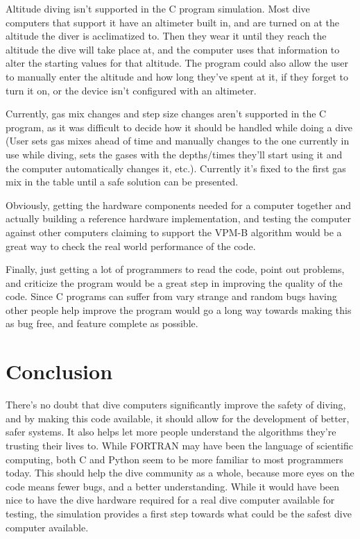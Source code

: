 \documentclass[12pt]{article}
\begin{document}
Altitude diving isn't supported in the C program simulation. Most dive computers that support it
have an altimeter built in, and are turned on at the altitude the diver is acclimatized to. Then
they wear it until they reach the altitude the dive will take place at, and the computer uses that
information to alter the starting values for that altitude. The program could also allow the user
to manually enter the altitude and how long they've spent at it, if they forget to turn it on, or
the device isn't configured with an altimeter.

Currently, gas mix changes and step size changes aren't supported in the C program, as it was difficult
to decide how it should be handled while doing a dive (User sets gas mixes ahead of time and manually changes
to the one currently in use while diving, sets the gases with the depths/times they'll start using it and the
computer automatically changes it, etc.). Currently it's fixed to the first gas mix in the table
until a safe solution can be presented.

Obviously, getting the hardware components needed for a computer together and actually building a reference
hardware implementation, and testing the computer against other computers claiming to support the VPM-B
algorithm would be a great way to check the real world performance of the code.

Finally, just getting a lot of programmers to read the code, point out problems, and criticize the program
 would be a great step in improving the quality of the code. Since C programs can suffer from
vary strange and random bugs having other people help improve the program would go a long way towards making this
as bug free, and feature complete as possible.

\section{Conclusion}

There's no doubt that dive computers significantly improve the safety of diving, and by making this code
available, it should allow for the development of better, safer systems. It also helps let more
people understand the algorithms they're trusting their lives to. While FORTRAN may have been the language
of scientific computing, both C and Python seem to be more familiar to most programmers today. This should
help the dive community as a whole, because more eyes on the code means fewer bugs, and a better understanding.
While it would have been nice to have the dive hardware required for a real dive computer available for testing,
the simulation provides a first step towards what could be the safest dive computer available.
\end{document}
